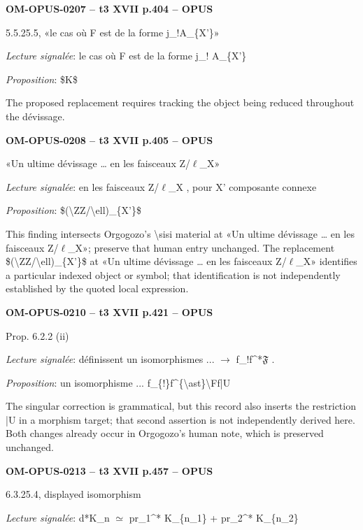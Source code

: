 \par\noindent\textbf{OM-OPUS-0207 -- t3 XVII p.404 -- OPUS}\par
5.5.25.5, «le cas où F est de la forme j\_!A\_\{X'\}»\par
\emph{Lecture signalée}: le cas où F est de la forme j\_! A\_\{X'\}\par
\emph{Proposition}: \$K\$\par
The proposed replacement requires tracking the object being reduced throughout the dévissage.\par
\par\noindent\textbf{OM-OPUS-0208 -- t3 XVII p.405 -- OPUS}\par
«Un ultime dévissage … en les faisceaux Z/\ensuremath{\ell}\_X»\par
\emph{Lecture signalée}: en les faisceaux Z/\ensuremath{\ell}\_X , pour X' composante connexe\par
\emph{Proposition}: \$(\textbackslash{}ZZ/\textbackslash{}ell)\_\{X'\}\$\par
This finding intersects Orgogozo's \textbackslash{}sisi material at «Un ultime dévissage … en les faisceaux Z/\ensuremath{\ell}\_X»; preserve that human entry unchanged. The replacement \$(\textbackslash{}ZZ/\textbackslash{}ell)\_\{X'\}\$ at «Un ultime dévissage … en les faisceaux Z/\ensuremath{\ell}\_X» identifies a particular indexed object or symbol; that identification is not independently established by the quoted local expression.\par
\par\noindent\textbf{OM-OPUS-0210 -- t3 XVII p.421 -- OPUS}\par
Prop. 6.2.2 (ii)\par
\emph{Lecture signalée}: définissent un isomorphismes ... \ensuremath{\to} f\_!f\textasciicircum{}*\ensuremath{𝔉} .\par
\emph{Proposition}: un isomorphisme ... f\_\{!\}f\textasciicircum{}\{\textbackslash{}ast\}\textbackslash{}Ff|U\par
The singular correction is grammatical, but this record also inserts the restriction |U in a morphism target; that second assertion is not independently derived here. Both changes already occur in Orgogozo's human note, which is preserved unchanged.\par
\par\noindent\textbf{OM-OPUS-0213 -- t3 XVII p.457 -- OPUS}\par
6.3.25.4, displayed isomorphism\par
\emph{Lecture signalée}: d*K\_n \ensuremath{\simeq} pr\_1\textasciicircum{}* K\_\{n\_1\} + pr\_2\textasciicircum{}* K\_\{n\_2\}\par
